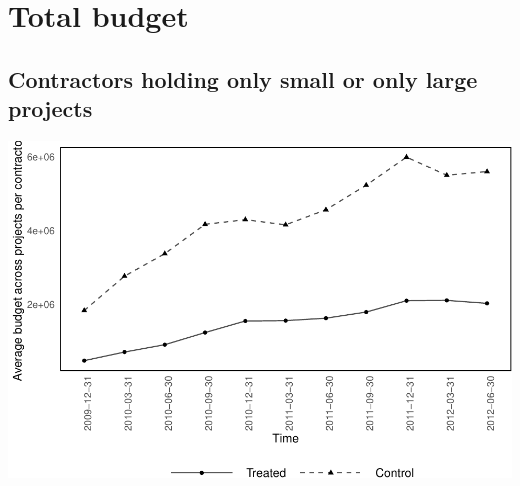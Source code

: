 \documentclass[
]{article}
\begin{document}
\hypertarget{total-budget}{%
\section{Total budget}\label{total-budget}}

\hypertarget{contractors-holding-only-small-or-only-large-projects-1}{%
\subsection{Contractors holding only small or only large
projects}\label{contractors-holding-only-small-or-only-large-projects-1}}

\includegraphics{qp_first_pc_delay-2_files/figure-latex/budget_0-1.pdf}
\end{document}
